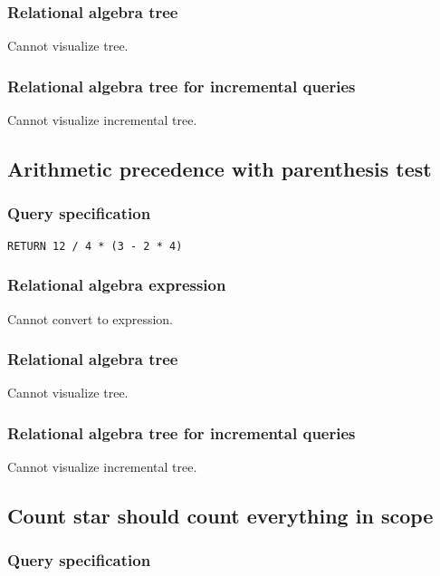 \subsubsection*{Relational algebra tree}

Cannot visualize tree.

\subsubsection*{Relational algebra tree for incremental queries}

Cannot visualize incremental tree.

\subsection{Arithmetic precedence with parenthesis test}

\subsubsection*{Query specification}

\begin{lstlisting}
RETURN 12 / 4 * (3 - 2 * 4)
\end{lstlisting}

\subsubsection*{Relational algebra expression}

Cannot convert to expression.

\subsubsection*{Relational algebra tree}

Cannot visualize tree.

\subsubsection*{Relational algebra tree for incremental queries}

Cannot visualize incremental tree.

\subsection{Count star should count everything in scope}

\subsubsection*{Query specification}

